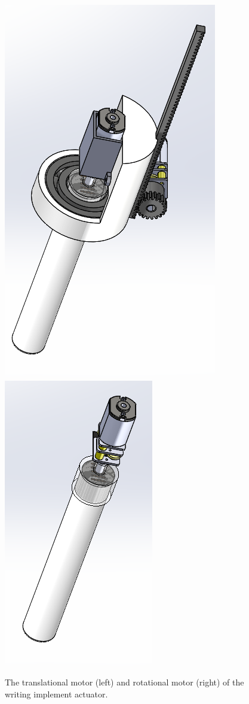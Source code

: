 \begin{figure}
 \centering
  	\includegraphics[width=0.48\columnwidth]{CAD-screen-shots/translational-motor.PNG}
  	\includegraphics[width=0.48\columnwidth]{CAD-screen-shots/rotational-motor.PNG}
	\caption{The translational motor (left) and rotational motor (right) of the writing implement actuator.}
 \label{fig:use-cases}
\end{figure}

